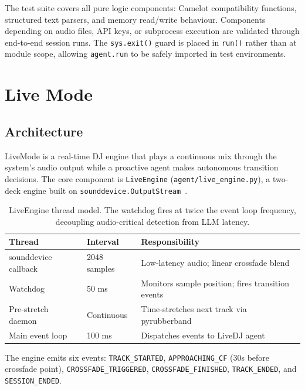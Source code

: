 \documentclass[11pt,a4paper]{article}
\begin{document}
The test suite covers all pure logic components: Camelot compatibility
functions, structured text parsers, and memory read/write behaviour.
Components depending on audio files, API keys, or subprocess execution are
validated through end-to-end session runs. The \texttt{sys.exit()} guard is
placed in \texttt{run()} rather than at module scope, allowing
\texttt{agent.run} to be safely imported in test environments.

\section{Live Mode}

\subsection{Architecture}

LiveMode is a real-time DJ engine that plays a continuous mix through the
system's audio output while a proactive agent makes autonomous transition
decisions. The core component is \texttt{LiveEngine}
(\texttt{agent/live\_engine.py}), a two-deck engine built on
\texttt{sounddevice.OutputStream}~\cite{sounddevice}.

\begin{table}[h]
\centering
\small
\begin{tabular}{@{}llp{6cm}@{}}
\toprule
\textbf{Thread} & \textbf{Interval} & \textbf{Responsibility} \\
\midrule
sounddevice callback & 2048 samples & Low-latency audio; linear crossfade blend \\
Watchdog & 50 ms & Monitors sample position; fires transition events \\
Pre-stretch daemon & Continuous & Time-stretches next track via pyrubberband \\
Main event loop & 100 ms & Dispatches events to LiveDJ agent \\
\bottomrule
\end{tabular}
\caption{LiveEngine thread model. The watchdog fires at twice the event loop
frequency, decoupling audio-critical detection from LLM latency.}
\label{tab:threads}
\end{table}

The engine emits six events: \texttt{TRACK\_STARTED},
\texttt{APPROACHING\_CF} (30s before crossfade point),
\texttt{CROSSFADE\_TRIGGERED}, \texttt{CROSSFADE\_FINISHED},
\texttt{TRACK\_ENDED}, and \texttt{SESSION\_ENDED}.
\end{document}
